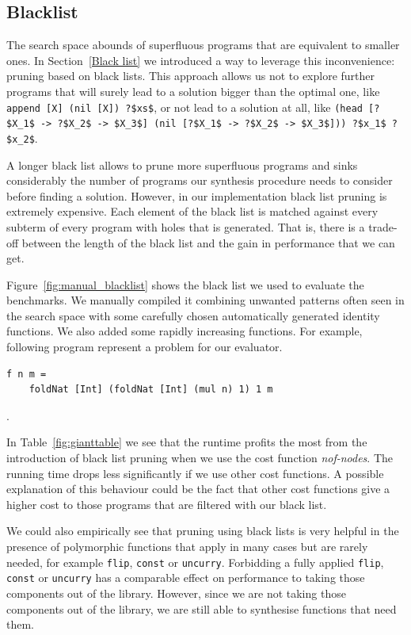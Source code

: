 \subsection{Blacklist}
The search space abounds of superfluous programs that are equivalent to smaller ones. In Section~\ref{Black list} we introduced a way to leverage this inconvenience: pruning based on black lists. This approach allows us not to explore further programs that will surely lead to a solution bigger than the optimal one, like \lstinline!append [X] (nil [X]) ?$xs$!, or not lead to a solution at all, like \lstinline!(head [?$X_1$ -> ?$X_2$ -> $X_3$] (nil [?$X_1$ -> ?$X_2$ -> $X_3$])) ?$x_1$ ?$x_2$!.

A longer black list allows to prune more superfluous programs and sinks considerably the number of programs our synthesis procedure needs to consider before finding a solution. However, in our implementation black list pruning is extremely expensive. Each element of the black list is matched against every subterm of every program with holes that is generated. That is, there is a trade-off between the length of the black list and the gain in performance that we can get.

Figure~\ref{fig:manual_blacklist} shows the black list  we used to evaluate the benchmarks. We manually compiled it combining unwanted patterns often seen in the search space with some carefully chosen automatically generated identity functions. We also added some rapidly increasing functions. For example, following program represent a problem for our evaluator.
\begin{lstlisting}[style=plain]
f n m =
    foldNat [Int] (foldNat [Int] (mul n) 1) 1 m
\end{lstlisting}
.

In Table~\ref{fig:gianttable} we see that the runtime profits the most from the introduction of black list pruning when we use the cost function \textit{nof-nodes}.
The running time drops less significantly if we use other cost functions. A possible explanation of this behaviour could be the fact that other cost functions give a higher cost to those programs that are filtered with our black list.

We could also empirically see that pruning using black lists is very helpful in the presence of polymorphic functions that apply in many cases but are rarely needed, for example \lstinline?flip?, \lstinline?const? or \lstinline?uncurry?. Forbidding a fully applied \lstinline?flip?, \lstinline?const? or \lstinline?uncurry? has a comparable effect on performance to taking those components out of the library. However, since we are not taking those components out of the library, we are still able to synthesise functions that need them.

